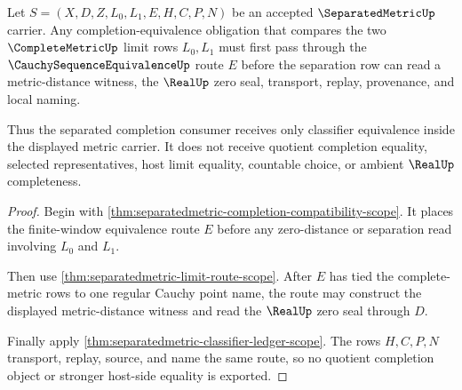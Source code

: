 \begin{theorem}
\label{thm:separatedmetric-completion-equivalence-obligation}
Let $S=(X,D,Z,L_0,L_1,E,H,C,P,N)$ be an accepted $\SeparatedMetricUp$ carrier. Any completion-equivalence obligation that compares the two $\CompleteMetricUp$ limit rows $L_0,L_1$ must first pass through the $\CauchySequenceEquivalenceUp$ route $E$ before the separation row can read a metric-distance witness, the $\RealUp$ zero seal, transport, replay, provenance, and local naming.

Thus the separated completion consumer receives only classifier equivalence inside the displayed metric carrier. It does not receive quotient completion equality, selected representatives, host limit equality, countable choice, or ambient $\RealUp$ completeness.
\end{theorem}
\begin{proof}
Begin with \autoref{thm:separatedmetric-completion-compatibility-scope}. It places the finite-window equivalence route $E$ before any zero-distance or separation read involving $L_0$ and $L_1$.

Then use \autoref{thm:separatedmetric-limit-route-scope}. After $E$ has tied the complete-metric rows to one regular Cauchy point name, the route may construct the displayed metric-distance witness and read the $\RealUp$ zero seal through $D$.

Finally apply \autoref{thm:separatedmetric-classifier-ledger-scope}. The rows $H,C,P,N$ transport, replay, source, and name the same route, so no quotient completion object or stronger host-side equality is exported.
\end{proof}

